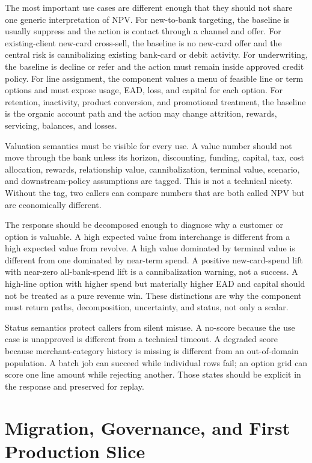 \documentclass[11pt]{article}
\newcommand{\1}{\mathbf{1}}
\begin{document}
The most important use cases are different enough that they should not share
one generic interpretation of NPV. For new-to-bank targeting, the baseline is
usually suppress and the action is contact through a channel and offer. For
existing-client new-card cross-sell, the baseline is no new-card offer and the
central risk is cannibalizing existing bank-card or debit activity. For
underwriting, the baseline is decline or refer and the action must remain
inside approved credit policy. For line assignment, the component values a
menu of feasible line or term options and must expose usage, EAD, loss, and
capital for each option. For retention, inactivity, product conversion, and
promotional treatment, the baseline is the organic account path and the action
may change attrition, rewards, servicing, balances, and losses.

Valuation semantics must be visible for every use. A value number should not
move through the bank unless its horizon, discounting, funding, capital, tax,
cost allocation, rewards, relationship value, cannibalization, terminal value,
scenario, and downstream-policy assumptions are tagged. This is not a
technical nicety. Without the tag, two callers can compare numbers that are
both called NPV but are economically different.

The response should be decomposed enough to diagnose why a customer or option
is valuable. A high expected value from interchange is different from a high
expected value from revolve. A high value dominated by terminal value is
different from one dominated by near-term spend. A positive new-card-spend
lift with near-zero all-bank-spend lift is a cannibalization warning, not a
success. A high-line option with higher spend but materially higher EAD and
capital should not be treated as a pure revenue win. These distinctions are
why the component must return paths, decomposition, uncertainty, and status,
not only a scalar.

Status semantics protect callers from silent misuse. A no-score because the
use case is unapproved is different from a technical timeout. A degraded score
because merchant-category history is missing is different from an
out-of-domain population. A batch job can succeed while individual rows fail;
an option grid can score one line amount while rejecting another. Those states
should be explicit in the response and preserved for replay.

\section{Migration, Governance, and First Production Slice}
\label{sec:main-governance-migration}
\end{document}
